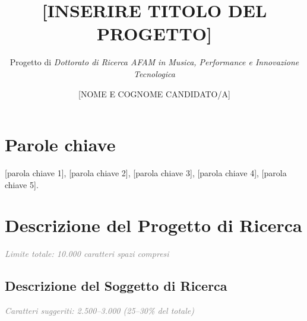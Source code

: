 \documentclass{gs-adonis}
\title{[INSERIRE TITOLO DEL PROGETTO]}
\subtitle{Progetto di \emph{Dottorato di Ricerca AFAM in Musica, Performance e Innovazione Tecnologica}}
\author{[NOME E COGNOME CANDIDATO/A]}
\begin{document}
\maketitle

\section*{Parole chiave}
[parola chiave 1], [parola chiave 2], [parola chiave 3], [parola chiave 4], [parola chiave 5].

\section{Descrizione del Progetto di Ricerca}
{\small\textcolor{gray}{\textit{Limite totale: 10.000 caratteri spazi compresi}}}

\subsection{Descrizione del Soggetto di Ricerca}
{\small\textcolor{gray}{\textit{Caratteri suggeriti: 2.500--3.000 (25--30\% del totale)}}}


\end{document}
